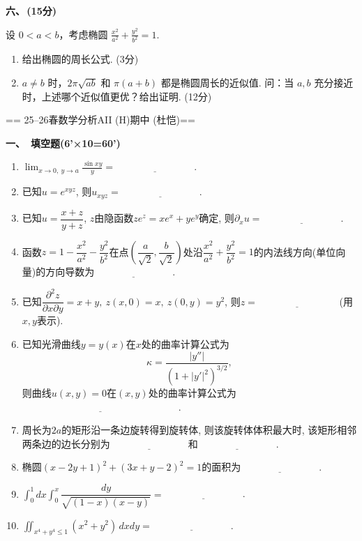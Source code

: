 \textbf{六、\,(15分)}

设 $0<a<b$，考虑椭圆 $\displaystyle\frac{x^{2}}{a^{2}}+\frac{y^{2}}{b^{2}}=1$.
\begin{enumerate}
    \item[(1)] 给出椭圆的周长公式. (3分)
    \item[(2)] $a\ne b$ 时，$2\pi\sqrt{ab}$ 和 $\pi(a+b)$ 都是椭圆周长的近似值. 问：当 $a, b$ 充分接近时，上述哪个近似值更优？给出证明. (12分)
\end{enumerate}




== 25--26春数学分析AII (H)期中 (杜恺)==

\textbf{一、\ 填空题(6'×10=60')}
\begin{enumerate}
    \item $\displaystyle\lim_{x\to0,\ y\to a}\frac{\sin xy}{y}=\underline{\hspace{8em}}$.
    \item 已知$u=e^{xyz}$, 则$u_{xyz}=\underline{\hspace{8em}}$.
    \item 已知$u=\dfrac{x+z}{y+z}$, $z$由隐函数$ze^z=xe^x+ye^y$确定, 则$\partial_xu=\underline{\hspace{8em}}$.
    \item 函数$z=1-\dfrac{x^2}{a^2}-\dfrac{y^2}{b^2}$在点$\left(\dfrac{a}{\sqrt{2}},\dfrac{b}{\sqrt{2}}\right)$处沿$\dfrac{x^2}{a^2}+\dfrac{y^2}{b^2}=1$的内法线方向(单位向量)的方向导数为$\underline{\hspace{8em}}$.
    \item 已知$\dfrac{\partial^2z}{\partial x\partial y}=x+y,\ z(x,0)=x,\ z(0,y)=y^2$, 则$z=\underline{\hspace{8em}}$ (用$x,y$表示).
    \item 已知光滑曲线$y=y(x)$在$x$处的曲率计算公式为
    $$\kappa=\frac{|y''|}{(1+|y'|^2)^{3/2}},$$
    则曲线$u(x,y)=0$在$(x,y)$处的曲率计算公式为$\underline{\hspace{16em}}$.
    \item 周长为$2a$的矩形沿一条边旋转得到旋转体, 则该旋转体体积最大时, 该矩形相邻两条边的边长分别为$\underline{\hspace{8em}}$和$\underline{\hspace{8em}}$.
    \item 椭圆$(x-2y+1)^2+(3x+y-2)^2=1$的面积为$\underline{\hspace{8em}}$.
    \item $\displaystyle\int_0^1dx\int_0^x\dfrac{dy}{\sqrt{(1-x)(x-y)}}=\underline{\hspace{8em}}$.
    \item $\displaystyle\iint_{x^4+y^4\leq1}(x^2+y^2)\,dxdy=\underline{\hspace{8em}}$.
\end{enumerate}

